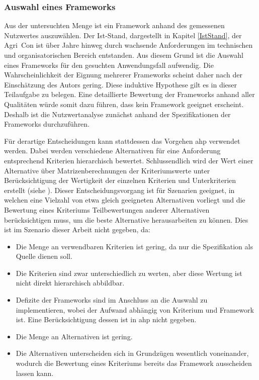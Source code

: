\subsubsection{Auswahl eines Frameworks}
Aus der untersuchten Menge ist ein Framework anhand des gemessenen Nutzwertes auszuwählen.
Der Ist-Stand, dargestellt in Kapitel \ref{IstStand}, der Agri~Con ist über Jahre hinweg durch wachsende  Anforderungen im technischen und organisatorischen Bereich entstanden.
Aus diesem Grund ist die Auswahl eines Frameworks für den gesuchten Anwendungsfall aufwendig.
Die Wahrscheinlichkeit der Eignung mehrerer Frameworks scheint daher nach der Einschätzung des Autors gering.
Diese induktive Hypothese gilt es in dieser Teilaufgabe zu belegen.
Eine detaillierte Bewertung der Frameworks anhand aller Qualitäten würde somit dazu führen, dass kein Framework geeignet erscheint.
Deshalb ist die Nutzwertanalyse zunächst anhand der Spezifikationen der Frameworks durchzuführen.

Für derartige Entscheidungen kann stattdessen das Vorgehen \Gls{ahp} verwendet werden.
Dabei werden verschiedene Alternativen für eine Anforderung entsprechend Kriterien hierarchisch bewertet.
Schlussendlich wird der Wert einer Alternative über Matrizenberechnungen der Kriteriumswerte unter Berücksichtigung der Wertigkeit der einzelnen Kriterien und Unterkriterien erstellt (siehe \cite{website:ahp-gaul}).
Dieser Entscheidungsvorgang ist für Szenarien geeignet, in welchen eine Vielzahl von etwa gleich geeigneten Alternativen vorliegt und die Bewertung eines Kriteriums Teilbewertungen anderer Alternativen berücksichtigen muss, um die beste Alternative herausarbeiten zu können.
Dies ist im Szenario dieser Arbeit nicht gegeben, da:
\begin{itemize}
\item Die Menge an verwendbaren Kriterien ist gering, da nur die Spezifikation als Quelle dienen soll.
\item Die Kriterien sind zwar unterschiedlich zu werten, aber diese Wertung ist nicht direkt hierarchisch abbildbar.
\item Defizite der Frameworks sind im Anschluss an die Auswahl  zu implementieren, wobei der Aufwand abhängig von Kriterium und Framework ist. Eine Berücksichtigung dessen ist in \Gls{ahp} nicht gegeben.
\item Die Menge an Alternativen ist gering.
\item Die Alternativen unterscheiden sich in Grundzügen wesentlich voneinander, wodurch die Bewertung eines Kriteriums bereits das Framework ausscheiden lassen kann.
\end{itemize}

